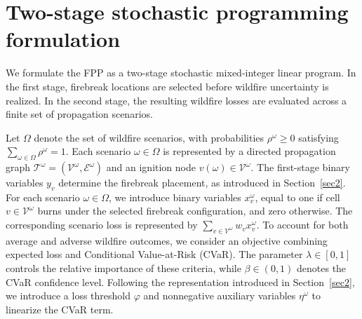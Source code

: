 \documentclass{itor}
\begin{document}


\section{Two-stage stochastic programming formulation}
\label{s:general-model}

We formulate the FPP as a two-stage stochastic mixed-integer
linear program. In the first stage, firebreak locations are
selected before wildfire uncertainty is realized. In the
second stage, the resulting wildfire losses are evaluated
across a finite set of propagation scenarios.

Let $\Omega$ denote the set of wildfire scenarios, with
probabilities $\rho^\omega \geq 0$ satisfying
$\sum_{\omega\in\Omega}\rho^\omega=1$.
Each scenario $\omega\in\Omega$ is represented by a
directed propagation graph
$\mathcal{T}^\omega=(\mathcal{V}^\omega,
\mathcal{E}^\omega)$ and an ignition node
$v(\omega)\in\mathcal{V}^\omega$. The first-stage binary variables $y_v$ determine the
firebreak placement, as introduced in
Section~\ref{sec2}. For each scenario $\omega\in\Omega$,
we introduce binary variables $x_v^\omega$, equal to
one if cell $v\in\mathcal{V}^\omega$ burns under the
selected firebreak configuration, and zero otherwise.
The corresponding scenario loss is represented by
$\sum_{v\in\mathcal{V}^\omega}w_vx_v^\omega$. To account for both average and adverse wildfire outcomes,
we consider an objective combining expected loss and
Conditional Value-at-Risk (CVaR). The parameter
$\lambda\in[0,1]$ controls the relative importance
of these criteria, while $\beta\in(0,1)$ denotes
the CVaR confidence level. Following the representation
introduced in Section~\ref{sec2}, we introduce a loss
threshold $\varphi$ and nonnegative auxiliary variables
$\eta^\omega$ to linearize the CVaR term.
\end{document}
